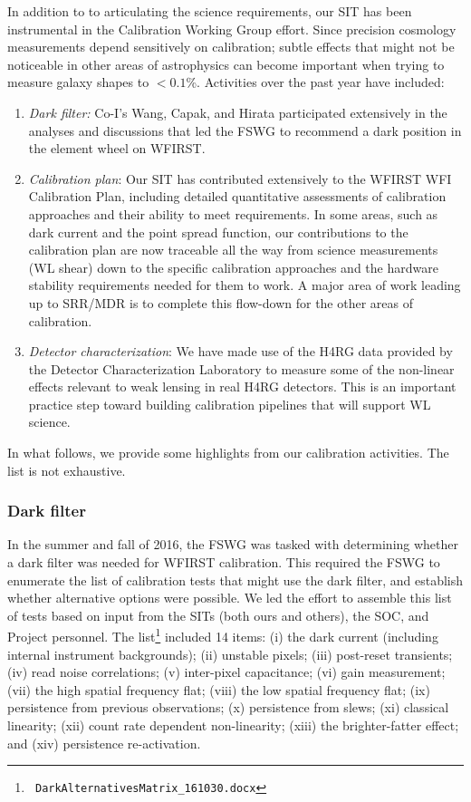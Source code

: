 \begin{summaryii}
  In addition to to articulating the science requirements, our SIT has been
  instrumental in the Calibration Working Group effort. Since precision
  cosmology measurements depend sensitively on calibration; subtle effects that
  might not be noticeable in other areas of astrophysics can become important
  when trying to measure galaxy shapes to $<0.1$\%. Activities over the past
  year have included:
  \begin{enumerate}
  \item {\em Dark filter:} Co-I's Wang, Capak, and Hirata participated
  extensively in the analyses and discussions that led the FSWG to recommend a
  dark position in the element wheel on WFIRST.
 \item {\em Calibration plan}: Our SIT has contributed extensively to the WFIRST WFI
Calibration Plan, including detailed quantitative assessments of calibration
approaches and their ability to meet requirements. In some areas, such as dark
current and the point spread function, our contributions to the calibration plan
are now traceable all the way from science measurements (WL shear) down to the
specific calibration approaches and the hardware stability requirements needed
for them to work. A major area of work leading up to SRR/MDR is to complete this
flow-down for the other areas of calibration.
\item {\em Detector characterization}: We have made use of the H4RG data provided by the Detector
Characterization Laboratory to measure some of the non-linear effects relevant
to weak lensing in real H4RG detectors. This is an important practice step
toward building calibration pipelines that will support WL science.
\end{enumerate}
In what follows, we provide some highlights from our calibration activities. The
list is not exhaustive.
\end{summaryii}

\subsubsection{Dark filter}

In the summer and fall of 2016, the FSWG was tasked with determining whether a
dark filter was needed for WFIRST calibration. This required the FSWG to
enumerate the list of calibration tests that might use the dark filter, and
establish whether alternative options were possible. We led the effort to
assemble this list of tests based on input from the SITs (both ours and others),
the SOC, and  Project personnel. The list\footnote{\tt
DarkAlternativesMatrix\_161030.docx} included 14 items: (i) the dark current
(including internal instrument backgrounds); (ii) unstable pixels; (iii)
post-reset transients; (iv) read noise correlations; (v) inter-pixel
capacitance; (vi) gain measurement; (vii) the high spatial frequency flat;
(viii) the low spatial frequency flat; (ix) persistence from previous
observations; (x) persistence from slews; (xi) classical linearity; (xii) count
rate dependent non-linearity; (xiii) the brighter-fatter effect; and (xiv)
persistence re-activation.


